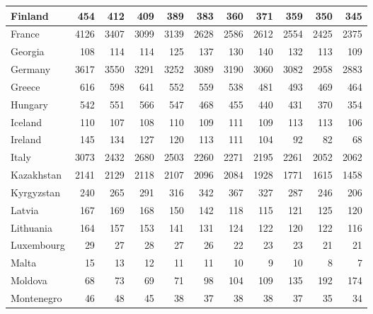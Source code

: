 \begin{table}
\begin{tabular}{|l|r|r|r|r|r|r|r|r|r|r|}
                       Finland&    454&    412&    409&    389&    383&    360&    371&    359&    350&    345\\\hline
                        France&   4126&   3407&   3099&   3139&   2628&   2586&   2612&   2554&   2425&   2375\\\hline
                       Georgia&    108&    114&    114&    125&    137&    130&    140&    132&    113&    109\\\hline
                       Germany&   3617&   3550&   3291&   3252&   3089&   3190&   3060&   3082&   2958&   2883\\\hline
                        Greece&    616&    598&    641&    552&    559&    538&    481&    493&    469&    464\\\hline
                       Hungary&    542&    551&    566&    547&    468&    455&    440&    431&    370&    354\\\hline
                       Iceland&    110&    107&    108&    110&    109&    111&    109&    113&    113&    106\\\hline
                       Ireland&    145&    134&    127&    120&    113&    111&    104&     92&     82&     68\\\hline
                         Italy&   3073&   2432&   2680&   2503&   2260&   2271&   2195&   2261&   2052&   2062\\\hline
                    Kazakhstan&   2141&   2129&   2118&   2107&   2096&   2084&   1928&   1771&   1615&   1458\\\hline
                    Kyrgyzstan&    240&    265&    291&    316&    342&    367&    327&    287&    246&    206\\\hline
                        Latvia&    167&    169&    168&    150&    142&    118&    115&    121&    125&    120\\\hline
                     Lithuania&    164&    157&    153&    141&    131&    124&    122&    120&    122&    116\\\hline
                    Luxembourg&     29&     27&     28&     27&     26&     22&     23&     23&     21&     21\\\hline
                         Malta&     15&     13&     12&     11&     11&     10&      9&     10&      8&      7\\\hline
                       Moldova&     68&     73&     69&     71&     98&    104&    109&    135&    192&    174\\\hline
                    Montenegro&     46&     48&     45&     38&     37&     38&     38&     37&     35&     34\\\hline

\end{tabular}
\end{table}
